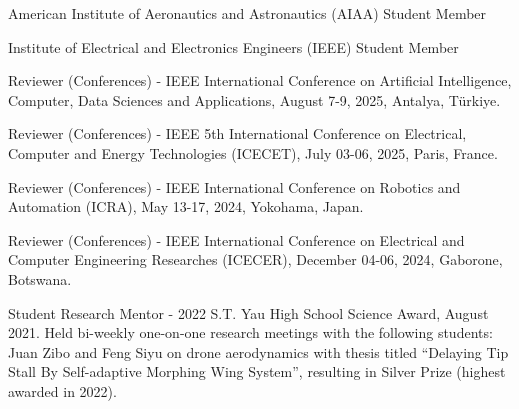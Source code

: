 

\vspace{10pt}
\begin{cvitems}
\paragraphstyle
\item American Institute of Aeronautics and Astronautics (AIAA) Student Member
\item Institute of Electrical and Electronics Engineers (IEEE) Student Member
\end{cvitems}
\vspace{10pt}

\vspace{10pt}
\begin{cvitems}
\paragraphstyle
\item Reviewer (Conferences) - IEEE International Conference on Artificial Intelligence, Computer, Data Sciences and Applications, August 7-9, 2025, Antalya, Türkiye.
\item Reviewer (Conferences) - IEEE 5th International Conference on Electrical, Computer and Energy Technologies (ICECET), July 03-06, 2025, Paris, France.
\item Reviewer (Conferences) - IEEE International Conference on Robotics and Automation (ICRA), May 13-17, 2024, Yokohama, Japan.
\item Reviewer (Conferences) - IEEE International Conference on Electrical and Computer Engineering Researches (ICECER), December 04-06, 2024, Gaborone, Botswana.
\item Student Research Mentor - 2022 S.T. Yau High School Science Award, August 2021. Held bi-weekly one-on-one research meetings with the following students: Juan Zibo and Feng Siyu on drone aerodynamics with thesis titled ``Delaying Tip Stall By Self-adaptive Morphing Wing System'', resulting in Silver Prize (highest awarded in 2022).
\end{cvitems}
\vspace{10pt}




